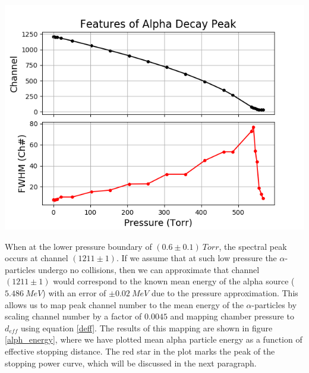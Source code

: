 \documentclass[10pt]{article}
\newenvironment{Figure}
{\par\medskip\noindent\minipage{\linewidth}}
{\endminipage\par\medskip}
\begin{document}
\begin{multicols}{2}
\begin{Figure}
	\includegraphics[width=\textwidth,keepaspectratio]{alf_peak_feat.png}
\end{Figure} 

When at the lower pressure boundary of $(0.6 \pm 0.1) \ Torr$, the spectral peak occurs at channel $(1211\pm1)$.  If we assume that at such low pressure the $\alpha$-particles undergo no collisions, then we can approximate that channel $(1211 \pm 1)$ would correspond to the known mean energy of the alpha source ($5.486 \ MeV$) with an error of $\pm 0.02 \ MeV$ due to the pressure approximation.  This allows us to map peak channel number to the mean energy of the $\alpha$-particles by scaling channel number by a factor of $0.0045$ and mapping chamber pressure to $d_{eff}$ using equation \ref{deff}.  The results of this mapping are shown in figure \ref{alph_energy}, where we have plotted mean alpha particle energy as a function of effective stopping distance.  The red star in the plot marks the peak of the stopping power curve, which will be discussed in the next paragraph.


\end{multicols}
\end{document}
